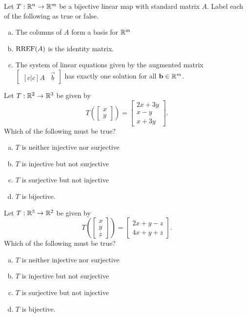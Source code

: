 \begin{applicationActivities}{3}{19}
\begin{activity}{5}
Let $T: \mathbb{R}^n \rightarrow \mathbb{R}^m$ be a bijective linear map with
standard matrix $A$. Label each of the following as true or false.
\begin{enumerate}[(a)]
\item The columns of $A$ form a basis for $\mathbb{R}^m$
\item $\operatorname{RREF}(A)$ is the identity matrix.
\item The system of linear equations given by the augmented matrix $\begin{bmatrix}[c|c] A & \vec{b} \end{bmatrix}$ has exactly one solution
for all \(\mathbf b \in \mathbb{R}^m\).
\end{enumerate}
\end{activity}

\begin{activity}{10}
Let $T: \mathbb{R}^2 \rightarrow \mathbb{R}^3$ be given by $$T\left(\begin{bmatrix} x \\ y \end{bmatrix} \right) = \begin{bmatrix} 2x+3y \\ x-y \\ x+3y\end{bmatrix}.$$  Which of the following must be true?
\begin{enumerate}[(a)]
\item $T$ is neither injective nor surjective
\item $T$ is injective but not surjective
\item $T$ is surjective but not injective
\item $T$ is bijective.
\end{enumerate}
\end{activity}

\begin{activity}{5}
Let $T: \mathbb{R}^3 \rightarrow \mathbb{R}^2$ be given by $$T\left(\begin{bmatrix} x \\ y  \\ z \end{bmatrix} \right) = \begin{bmatrix} 2x+y-z \\ 4x+y+z\end{bmatrix}.$$  Which of the following must be true?
\begin{enumerate}[(a)]
\item $T$ is neither injective nor surjective
\item $T$ is injective but not surjective
\item $T$ is surjective but not injective
\item $T$ is bijective.
\end{enumerate}
\end{activity}


\end{applicationActivities}
